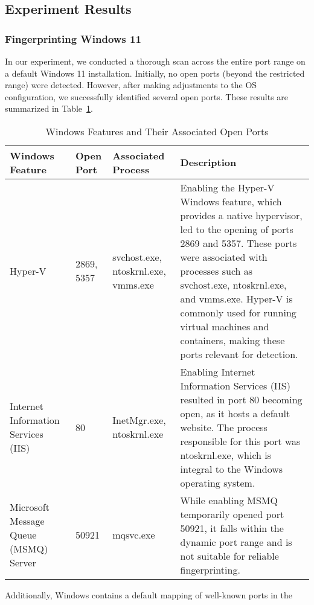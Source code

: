 \subsection{Experiment Results}

\subsubsection{Fingerprinting Windows 11}
\label{section:win11-fingerprint}

In our experiment, we conducted a thorough scan across the entire port range on a default Windows 11 installation. Initially, no open ports (beyond the restricted range) were detected. However, after making adjustments to the OS configuration, we successfully identified several open ports. These results are summarized in Table~\ref{tab:windows-features-open-ports}.

\begin{table}[htbp]
\footnotesize
\centering
\begin{tabular}{p{4cm}p{1cm}p{2cm}p{8cm}}
    \toprule
    Windows Feature & Open Port & Associated Process & Description \\
     \midrule
     Hyper-V & 2869, 5357 & svchost.exe, ntoskrnl.exe, vmms.exe & Enabling the Hyper-V Windows feature, which provides a native hypervisor, led to the opening of ports 2869 and 5357. These ports were associated with processes such as svchost.exe, ntoskrnl.exe, and vmms.exe. Hyper-V is commonly used for running virtual machines and containers, making these ports relevant for detection. \\
     
     Internet Information Services (IIS) & 80 & InetMgr.exe, ntoskrnl.exe & Enabling Internet Information Services (IIS) resulted in port 80 becoming open, as it hosts a default website. The process responsible for this port was ntoskrnl.exe, which is integral to the Windows operating system. \\
     
     Microsoft Message Queue (MSMQ) Server & 50921 & mqsvc.exe & While enabling MSMQ temporarily opened port 50921, it falls within the dynamic port range and is not suitable for reliable fingerprinting. \\
     \bottomrule
\end{tabular}
\caption{Windows Features and Their Associated Open Ports}
\label{tab:windows-features-open-ports}
\end{table}

Additionally, Windows contains a default mapping of well-known ports in the 

